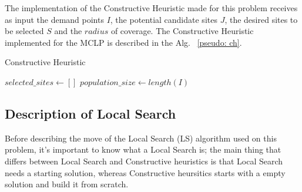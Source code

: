\documentclass[11pt, a4paper]{article}
\begin{document}
The implementation of the Constructive Heuristic made for this problem receives as input the demand points $I$, the potential candidate sites $J$, the desired sites to be selected $S$ and the $radius$ of coverage.
The Constructive Heuristic implemented for the MCLP is described in the Alg. ~\ref{pseudo: ch}.

\begin{algorithm}[H]
	\caption{Constructive Heuristic}\label{pseudo: ch}
	\SetAlgoLined
	\DontPrintSemicolon

	\KwResult{}
	$selected\_sites \gets []$\;
	$population\_size \gets length(I)$\;
	\BlankLine
	\BlankLine
	
\end{algorithm}


\subsection{Description of Local Search}
Before describing the move of the Local Search (LS) algorithm used on this problem, it's important to know what a Local Search is; the main thing that differs between Local Search and Constructive heuristics is that Local Search needs a starting solution, whereas Constructive heursitics starts with a empty solution and build it from scratch. 
\end{document}

